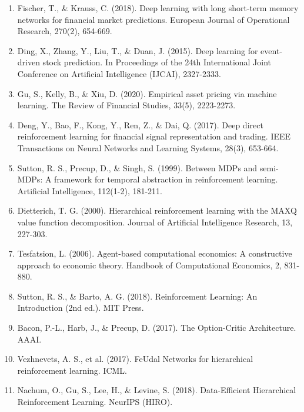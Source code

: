 \documentclass[11pt,a4paper]{article}
\begin{document}
\begin{enumerate}
\item Fischer, T., \& Krauss, C. (2018). Deep learning with long short-term memory networks for financial market predictions. European Journal of Operational Research, 270(2), 654-669.

\item Ding, X., Zhang, Y., Liu, T., \& Duan, J. (2015). Deep learning for event-driven stock prediction. In Proceedings of the 24th International Joint Conference on Artificial Intelligence (IJCAI), 2327-2333.

\item Gu, S., Kelly, B., \& Xiu, D. (2020). Empirical asset pricing via machine learning. The Review of Financial Studies, 33(5), 2223-2273.

\item Deng, Y., Bao, F., Kong, Y., Ren, Z., \& Dai, Q. (2017). Deep direct reinforcement learning for financial signal representation and trading. IEEE Transactions on Neural Networks and Learning Systems, 28(3), 653-664.

\item Sutton, R. S., Precup, D., \& Singh, S. (1999). Between MDPs and semi-MDPs: A framework for temporal abstraction in reinforcement learning. Artificial Intelligence, 112(1-2), 181-211.

\item Dietterich, T. G. (2000). Hierarchical reinforcement learning with the MAXQ value function decomposition. Journal of Artificial Intelligence Research, 13, 227-303.

\item Tesfatsion, L. (2006). Agent-based computational economics: A constructive approach to economic theory. Handbook of Computational Economics, 2, 831-880.

\item Sutton, R. S., \& Barto, A. G. (2018). Reinforcement Learning: An Introduction (2nd ed.). MIT Press.

\item Bacon, P.-L., Harb, J., \& Precup, D. (2017). The Option-Critic Architecture. AAAI.

\item Vezhnevets, A. S., et al. (2017). FeUdal Networks for hierarchical reinforcement learning. ICML.

\item Nachum, O., Gu, S., Lee, H., \& Levine, S. (2018). Data-Efficient Hierarchical Reinforcement Learning. NeurIPS (HIRO).


\end{enumerate}
\end{document}
